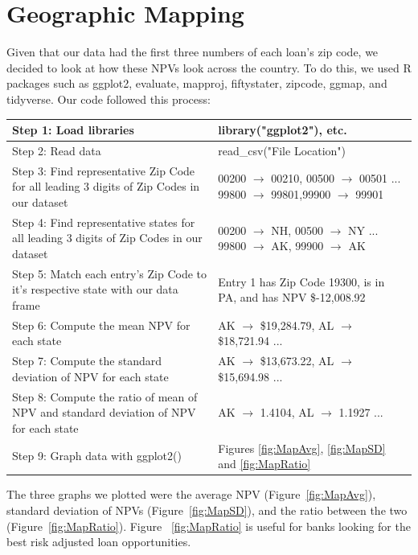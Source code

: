 \documentclass[12 pt]{uncw_thesis}
\theoremstyle{plain}
\theoremstyle{remark}
\theoremstyle{definition}
\begin{document}
\section{Geographic Mapping}
Given that our data had the first three numbers of each loan's zip code, we decided to look at how these NPVs look across the country. To do this, we used R packages such as ggplot2, evaluate, mapproj, fiftystater, zipcode, ggmap, and tidyverse. Our code followed this process:
\begin{center}
	\begin{tabular}{|M{6cm}|M{8cm}|} 
		\hline
		Step 1: Load libraries& library("ggplot2"), etc.\\
		\hline
		Step 2: Read data & read\_csv("File Location")\\
		\hline
		Step 3: Find representative Zip Code for all leading 3 digits of Zip Codes in our dataset&  00200 $\rightarrow$ 00210,  00500 $\rightarrow$ 00501 ... 99800 $\rightarrow$ 99801,99900 $\rightarrow$ 99901\\
		\hline
		Step 4: Find representative states for all leading 3 digits of Zip Codes in our dataset& 00200 $\rightarrow$ NH, 00500 $\rightarrow$ NY ... 99800 $\rightarrow$ AK, 99900 $\rightarrow$ AK\\
		\hline
		Step 5: Match each entry's Zip Code to it's respective state with our data frame& Entry 1 has Zip Code 19300, is in PA, and has NPV \$-12,008.92\\
		\hline
		Step 6: Compute the mean NPV for each state & AK $\rightarrow$ \$19,284.79, AL $\rightarrow$ \$18,721.94 ...\\ 
		\hline
		Step 7: Compute the standard deviation of NPV for each state & AK $\rightarrow$ \$13,673.22, AL $\rightarrow$ \$15,694.98 ...\\
		\hline
		Step 8: Compute the ratio of mean of NPV and standard deviation of NPV for each state & AK $\rightarrow$ 1.4104, AL $\rightarrow$ 1.1927 ...\\
		\hline
		Step 9: Graph data with ggplot2() & Figures \ref{fig:MapAvg}, \ref{fig:MapSD} and \ref{fig:MapRatio}\\
		\hline
	\end{tabular}
\end{center}
The three graphs we plotted were the average NPV (Figure~\ref{fig:MapAvg}), standard deviation of NPVs (Figure~\ref{fig:MapSD}), and the ratio between the two (Figure~\ref{fig:MapRatio}). Figure ~\ref{fig:MapRatio} is useful for banks looking for the best risk adjusted loan opportunities.
\end{document}
